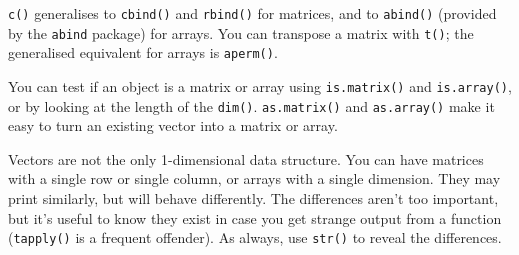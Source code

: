 \begin{Shaded}
\begin{Highlighting}[]
\StringTok{ }\NormalTok{(}\NormalTok{, }\NormalTok{)}
\StringTok{ }\NormalTok{(}\NormalTok{, }\NormalTok{, }\NormalTok{)}

\StringTok{ }\NormalTok{(}\NormalTok{(}\NormalTok{, }\NormalTok{), }\NormalTok{(}\NormalTok{, }\NormalTok{, }\NormalTok{), }\NormalTok{(}\NormalTok{, }\NormalTok{))}
\CommentTok{#> }
\CommentTok{#> }
\CommentTok{#> }
\end{Highlighting}
\end{Shaded}

\texttt{c()} generalises to \texttt{cbind()} and \texttt{rbind()} for
matrices, and to \texttt{abind()} (provided by the \texttt{abind}
package) for arrays. You can transpose a matrix with \texttt{t()}; the
generalised equivalent for arrays is \texttt{aperm()}.

You can test if an object is a matrix or array using
\texttt{is.matrix()} and \texttt{is.array()}, or by looking at the
length of the \texttt{dim()}. \texttt{as.matrix()} and
\texttt{as.array()} make it easy to turn an existing vector into a
matrix or array.

Vectors are not the only 1-dimensional data structure. You can have
matrices with a single row or single column, or arrays with a single
dimension. They may print similarly, but will behave differently. The
differences aren't too important, but it's useful to know they exist in
case you get strange output from a function (\texttt{tapply()} is a
frequent offender). As always, use \texttt{str()} to reveal the
differences.

